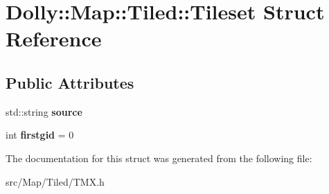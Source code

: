 \hypertarget{struct_dolly_1_1_map_1_1_tiled_1_1_tileset}{}\section{Dolly\+:\+:Map\+:\+:Tiled\+:\+:Tileset Struct Reference}
\label{struct_dolly_1_1_map_1_1_tiled_1_1_tileset}
\subsection*{Public Attributes}
\begin{DoxyCompactItemize}
\item 
\mbox{\label{struct_dolly_1_1_map_1_1_tiled_1_1_tileset_aa9b0e4b8e7468cb52df1c20c82dfcce7}} 
std\+::string {\bfseries source}
\item 
\mbox{\label{struct_dolly_1_1_map_1_1_tiled_1_1_tileset_a1c6623236343b821f0bb2a55e93c7585}} 
int {\bfseries firstgid} = 0
\end{DoxyCompactItemize}


The documentation for this struct was generated from the following file\+:\begin{DoxyCompactItemize}
\item 
src/\+Map/\+Tiled/T\+M\+X.\+h\end{DoxyCompactItemize}
